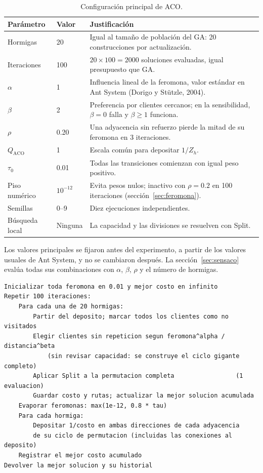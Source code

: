 \documentclass[11pt,a4paper]{article}
\numberwithin{equation}{section}
\begin{document}
\begin{table}[H]\centering\small
\caption{Configuración principal de ACO.}\label{tab:acoparam}
\begin{tabular}{p{3.2cm}p{2.6cm}p{8.8cm}}\toprule
Parámetro & Valor & Justificación\\\midrule
Hormigas & 20 & Igual al tamaño de población del GA: 20 construcciones por actualización.\\
Iteraciones & 100 & \(20\times100=2000\) soluciones evaluadas, igual presupuesto que GA.\\
\(\alpha\) & 1 & Influencia lineal de la feromona, valor estándar en Ant System (Dorigo y Stützle, 2004).\\
\(\beta\) & 2 & Preferencia por clientes cercanos; en la sensibilidad, \(\beta=0\) falla y \(\beta\ge1\) funciona.\\
\(\rho\) & 0.20 & Una adyacencia sin refuerzo pierde la mitad de su feromona en 3 iteraciones.\\
\(Q_{\mathrm{ACO}}\) & 1 & Escala común para depositar \(1/Z_h\).\\
\(\tau_0\) & 0.01 & Todas las transiciones comienzan con igual peso positivo.\\
Piso numérico & \(10^{-12}\) & Evita pesos nulos; inactivo con \(\rho=0.2\) en 100 iteraciones (sección~\ref{sec:feromona}).\\
Semillas & 0--9 & Diez ejecuciones independientes.\\
Búsqueda local & Ninguna & La capacidad y las divisiones se resuelven con Split.\\\bottomrule
\end{tabular}
\end{table}

Los valores principales se fijaron antes del experimento, a partir de los valores usuales de Ant System, y no se cambiaron después. La sección~\ref{sec:sensaco} evalúa todas sus combinaciones con \(\alpha\), \(\beta\), \(\rho\) y el número de hormigas.

\begin{lstlisting}[caption={Pseudocódigo de ACO con decodificación Split.}]
Inicializar toda feromona en 0.01 y mejor costo en infinito
Repetir 100 iteraciones:
    Para cada una de 20 hormigas:
        Partir del deposito; marcar todos los clientes como no visitados
        Elegir clientes sin repeticion segun feromona^alpha / distancia^beta
            (sin revisar capacidad: se construye el ciclo gigante completo)
        Aplicar Split a la permutacion completa                 (1 evaluacion)
        Guardar costo y rutas; actualizar la mejor solucion acumulada
    Evaporar feromonas: max(1e-12, 0.8 * tau)
    Para cada hormiga:
        Depositar 1/costo en ambas direcciones de cada adyacencia
        de su ciclo de permutacion (incluidas las conexiones al deposito)
    Registrar el mejor costo acumulado
Devolver la mejor solucion y su historial
\end{lstlisting}
\end{document}
